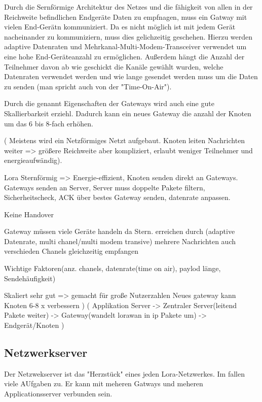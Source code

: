 \documentclass[a4paper,12pt]{article}
\begin{document}
            Durch die Sernförmige Architektur des Netzes und die fähigkeit von allen in der Reichweite befindlichen Endgeräte Daten zu empfnagen, muss ein Gatway mit vielen End-Gerätn kommuniziert. 
            Da es nicht möglich ist mit jedem Gerät nacheinander zu kommuniziern, muss dies gelichzeitig geschehen. Hierzu werden adaptive Datenraten und Mehrkanal-Multi-Modem-Transceiver verwendet um eine hohe End-Geräteanzahl zu ermöglichen.
            Außerdem hängt die Anzahl der Teilnehmer davon ab wie geschickt die Kanäle gewählt wurden, welche Datenraten verwendet werden und wie lange gesendet werden muss um die Daten zu senden (man spricht auch von der "Time-On-Air").

            Durch die genannt Eigenschaften der Gateways wird auch eine gute Skallierbarkeit erziehl. Dadurch kann ein neues Gateway die anzahl der Knoten um das 6 bis 8-fach erhöhen. 
            
            \cite{WhatIsLoRa}(
                Meistens wird ein Netzförmiges Netzt aufgebaut. Knoten leiten Nachrichten weiter => größere Reichweite aber kompliziert, erlaubt weniger Teilnehmer und energieaufwändig). 

                Lora Sternförmig => Energie-effizient, Knoten senden direkt an Gateways. Gateways senden an Server, Server muss doppelte Pakete filtern, Sicherheitscheck, ACK über bestes Gateway senden, datenrate anpassen.

                Keine Handover

                Gateway müssen viele Geräte handeln da Stern. erreichen durch (adaptive Datenrate, multi chanel/multi modem transive) mehrere Nachrichten auch verschieden Chanels gleichzeitig empfangen

                Wichtige Faktoren(anz. chanels, datenrate(time on air), paylod länge, Sendehäufigkeit)
            
                Skaliert sehr gut => gemacht für große Nutzerzahlen
                Neues gateway kann Knoten 6-8 x verbessern
                )
            \cite{LoRaSpec}(
                Applikation Server -> Zentraler Server(leitend Pakete weiter) -> Gateway(wandelt lorawan in ip Pakete um) -> Endgerät/Knoten       )
        \subsection{Netzwerkserver}
            Der Netzwekserver ist das "Herzstück" eines jeden Lora-Netzwerkes. Im fallen viele AUfgaben zu. Er kann mit meheren Gatways und meheren Applicationsserver verbunden sein.
\end{document}
